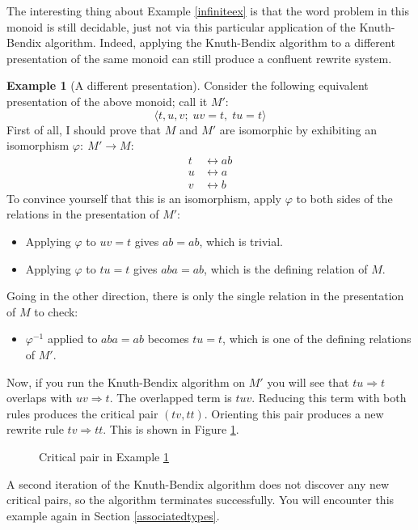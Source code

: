 \documentclass[headsepline,bibliography=totoc]{scrreport}
\theoremstyle{definition}
\newtheorem{example}{Example}[chapter]
\theoremstyle{definition}
\theoremstyle{definition}
\begin{document}
The interesting thing about Example \ref{infiniteex} is that the word problem in this monoid is still decidable, just not via this particular application of the Knuth-Bendix algorithm. Indeed, applying the Knuth-Bendix algorithm to a different presentation of the same monoid can still produce a confluent rewrite system.

\begin{example}[A different presentation]\label{diffpresex}
Consider the following equivalent presentation of the above monoid; call it $M'$:
\[\langle t, u, v;\; uv=t,\; tu=t\rangle\]
First of all, I should prove that $M$ and $M'$ are isomorphic by exhibiting an isomorphism $\varphi\colon~M'\rightarrow M$:
\begin{align*}
t&\leftrightarrow ab\\
u&\leftrightarrow a\\
v&\leftrightarrow b
\end{align*}
To convince yourself that this is an isomorphism, apply $\varphi$ to both sides of the relations in the presentation of $M'$:
\begin{itemize}
\item Applying $\varphi$ to $uv=t$ gives $ab=ab$, which is trivial.
\item Applying $\varphi$ to $tu=t$ gives $aba=ab$, which is the defining relation of $M$.
\end{itemize}
Going in the other direction, there is only the single relation in the presentation of $M$ to check:
\begin{itemize}
\item $\varphi^{-1}$ applied to $aba=ab$ becomes $tu=t$, which is one of the defining relations of $M'$.
\end{itemize}

Now, if you run the Knuth-Bendix algorithm on $M'$ you will see that $tu\Rightarrow t$ overlaps with $uv\Rightarrow t$. The overlapped term is $tuv$. Reducing this term with both rules produces the critical pair $(tv, tt)$. Orienting this pair produces a new rewrite rule $tv\Rightarrow tt$. This is shown in Figure \ref{diffpresfig}.
\begin{figure}\caption{Critical pair in Example \ref{diffpresex}}\label{diffpresfig}
\begin{center}
\end{center}
\end{figure}

A second iteration of the Knuth-Bendix algorithm does not discover any new critical pairs, so the algorithm terminates successfully. You will encounter this example again in Section \ref{associatedtypes}.
\end{example}
\end{document}
